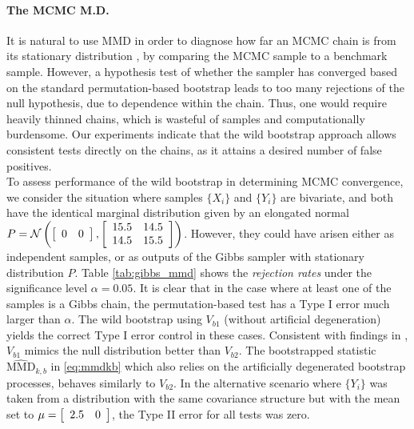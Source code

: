 \paragraph{The MCMC M.D.}
It is natural to use MMD in order to diagnose how far an MCMC chain is from its stationary distribution \cite[Section 5]{sejdinovic_KAMH}, 
by comparing the MCMC sample to a benchmark sample. However, a hypothesis test of whether the sampler has converged based on the standard permutation-based bootstrap leads to too many rejections of the null hypothesis, due to  dependence within the chain. Thus, one would require heavily thinned chains, which is wasteful of samples and computationally burdensome.
Our experiments indicate that the wild bootstrap approach allows consistent tests directly on the chains, as it attains a desired number of false positives.\\
To assess performance of the wild bootstrap in determining MCMC convergence, we consider the situation where samples $\{X_i\}$ and $\{Y_i\}$ are bivariate, and both have the identical marginal distribution given by an elongated normal
$P=\mathcal{N}\left(\left[\protect\begin{array}{cc}
0 & 0\protect\end{array}\right],\left[\protect\begin{array}{cc}
15.5 & 14.5\protect\\
14.5 & 15.5
\protect\end{array}\right]\right)$.
However, they could have arisen either as independent samples, or as outputs of the Gibbs sampler with stationary distribution $P$. 
Table \ref{tab:gibbs_mmd} shows the \emph{rejection rates} under the significance level $\alpha=0.05$. It is clear that in the case where at least one of the samples is a Gibbs chain, the permutation-based test has a Type I error much larger than $\alpha$. 
The wild bootstrap using $V_{b1}$ (without artificial degeneration) yields the correct Type I error control in these cases. Consistent with findings in \cite[Section 5]{leucht_dependent_2013}, $V_{b1}$ mimics the null distribution better than $V_{b2}$. The bootstrapped statistic $\widehat{\text{MMD}}_{k,b}$ in \eqref{eq:mmdkb} which also relies on the artificially degenerated bootstrap processes, behaves similarly to $V_{b2}$.
In the alternative scenario where $\{Y_i\}$ was taken from a distribution with the same covariance structure but with the mean set to $\mu= \left[\protect\begin{array}{cc}
2.5 & 0\protect\end{array}\right]$, the Type II error for all tests was zero.
\vspace{-0.2cm}
